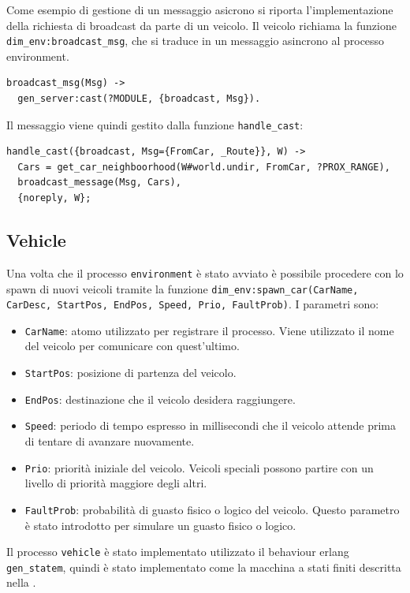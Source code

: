 \documentclass{memoir}
\begin{document}
Come esempio di gestione di un messaggio asicrono si riporta l'implementazione
della richiesta di broadcast da parte di un veicolo. Il veicolo richiama la
funzione \texttt{dim\_env:broadcast\_msg}, che si traduce in un messaggio
asincrono al processo environment.
\begin{verbatim}
broadcast_msg(Msg) ->
  gen_server:cast(?MODULE, {broadcast, Msg}).
\end{verbatim}
Il messaggio viene quindi gestito dalla funzione \texttt{handle\_cast}:
\begin{verbatim}
handle_cast({broadcast, Msg={FromCar, _Route}}, W) ->
  Cars = get_car_neighboorhood(W#world.undir, FromCar, ?PROX_RANGE),
  broadcast_message(Msg, Cars),
  {noreply, W};
\end{verbatim}

\subsection{Vehicle}
Una volta che il processo \texttt{environment} è stato avviato è possibile
procedere con lo spawn di nuovi veicoli tramite la funzione
\texttt{dim\_env:spawn\_car(CarName, CarDesc, StartPos, EndPos, Speed, Prio,
  FaultProb)}. I parametri sono:
\begin{itemize}
\item \texttt{CarName}: atomo utilizzato per registrare il processo. Viene
  utilizzato il nome del veicolo per comunicare con quest'ultimo.
\item \texttt{StartPos}: posizione di partenza del veicolo.
\item \texttt{EndPos}: destinazione che il veicolo desidera raggiungere.
\item \texttt{Speed}: periodo di tempo espresso in millisecondi che il veicolo
  attende prima di tentare di avanzare nuovamente.
\item \texttt{Prio}: priorità iniziale del veicolo. Veicoli speciali possono
  partire con un livello di priorità maggiore degli altri.
\item \texttt{FaultProb}: probabilità di guasto fisico o logico del veicolo.
  Questo parametro è stato introdotto per simulare un guasto fisico o logico.
\end{itemize}
Il processo \texttt{vehicle} è stato implementato utilizzato il behaviour erlang
\texttt{gen\_statem}, quindi è stato implementato come la macchina a stati
finiti descritta nella .
\end{document}
